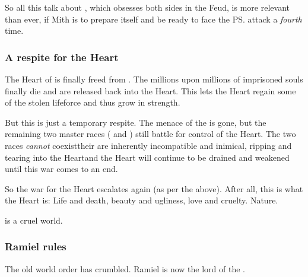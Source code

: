 So all this talk about , which obsesses both sides in the Feud, is more relevant than ever, if Mith is to prepare itself and be ready to face the \ps{\Voidbringer} attack a \emph{fourth} time. 






\subsubsection{A respite for the Heart}
The Heart of \Miith{} is finally freed from . 
The millions upon millions of imprisoned souls finally die and are released back into the Heart. 
This lets the Heart regain some of the stolen lifeforce and thus grow in strength. 

But this is just a temporary respite. 
The menace of the \banes{} is gone, but the remaining two master races (\dragons{} and \resphain) still battle for control of the Heart. 
The two races \emph{cannot} coexist\dash their \matrices{} are inherently incompatible and inimical, ripping and tearing into the Heart\dash and the Heart will continue to be drained and weakened until this war comes to an end. 

So the war for the Heart escalates again (as per the  above). 
After all, this is what the Heart is: 
Life and death, beauty and ugliness, love and cruelty. 
Nature. 

\Miith{} is a cruel world. 





\subsubsection{Ramiel rules}
The old world order has crumbled. 
Ramiel is now the lord of the \resphain.






